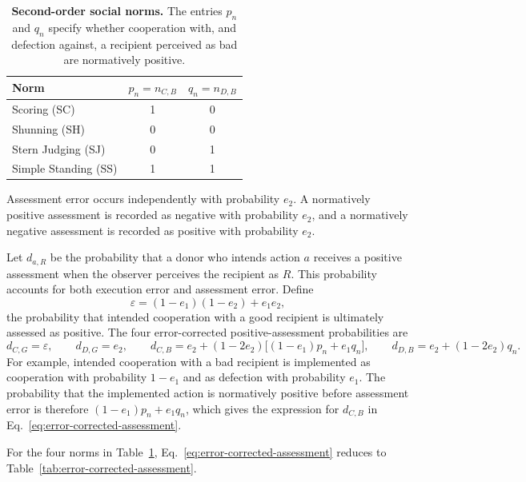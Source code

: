 \documentclass[fleqn,10pt]{wlscirep}
\begin{document}
\begin{table}[t]
\centering
\caption{\textbf{Second-order social norms.} The entries $p_n$ and $q_n$ specify whether cooperation with, and defection against, a recipient perceived as bad are normatively positive.}
\label{tab:social-norms}
\begin{tabular}{lcc}
\hline
Norm & $p_n=n_{C,B}$ & $q_n=n_{D,B}$ \\
\hline
Scoring (SC) & 1 & 0 \\
Shunning (SH) & 0 & 0 \\
Stern Judging (SJ) & 0 & 1 \\
Simple Standing (SS) & 1 & 1 \\
\hline
\end{tabular}
\end{table}

Assessment error occurs independently with probability $e_2$. A normatively positive assessment is recorded as negative with probability $e_2$, and a normatively negative assessment is recorded as positive with probability $e_2$.

Let $d_{a,R}$ be the probability that a donor who intends action $a$ receives a positive assessment when the observer perceives the recipient as $R$. This probability accounts for both execution error and assessment error. Define
\[
\varepsilon=(1-e_1)(1-e_2)+e_1e_2,
\]
the probability that intended cooperation with a good recipient is ultimately assessed as positive. The four error-corrected positive-assessment probabilities are
\begin{equation}
\label{eq:error-corrected-assessment}
d_{C,G}=\varepsilon,\qquad
d_{D,G}=e_2,\qquad
d_{C,B}=e_2+(1-2e_2)\big[(1-e_1)p_n+e_1q_n\big],\qquad
d_{D,B}=e_2+(1-2e_2)q_n .
\end{equation}
For example, intended cooperation with a bad recipient is implemented as cooperation with probability $1-e_1$ and as defection with probability $e_1$. The probability that the implemented action is normatively positive before assessment error is therefore $(1-e_1)p_n+e_1q_n$, which gives the expression for $d_{C,B}$ in Eq.~\eqref{eq:error-corrected-assessment}.

For the four norms in Table~\ref{tab:social-norms}, Eq.~\eqref{eq:error-corrected-assessment} reduces to Table~\ref{tab:error-corrected-assessment}.
\end{document}

